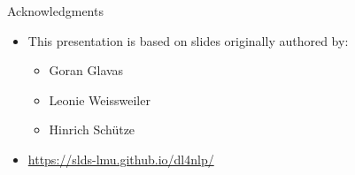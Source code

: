 \begin{vbframe}{Acknowledgments}

\vfill

\begin{itemize}
\item This presentation is based on slides originally authored by:
  \begin{itemize}
\item Goran Glavas
\item Leonie Weissweiler
\item Hinrich Sch\"{u}tze
\end{itemize}

\item \url{https://slds-lmu.github.io/dl4nlp/}
\end{itemize}

\vfill

\end{vbframe}

